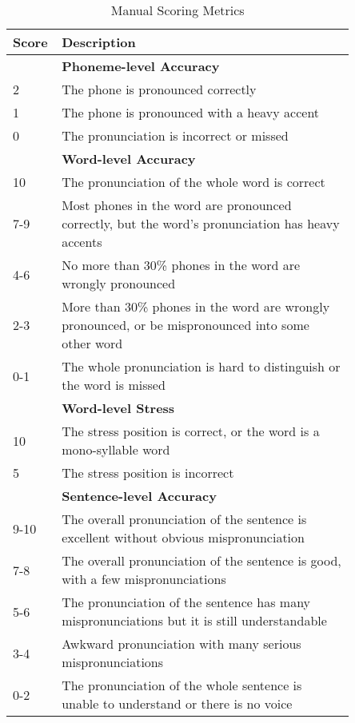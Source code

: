 \documentclass[a4paper]{article}
\begin{document}
\begin{table*}[t]
  \caption{Manual Scoring Metrics}
  \label{tab:metrics}
  \centering
  \begin{tabular}{p{0.05\linewidth}p{0.8\linewidth}}
    \toprule
    \textbf{Score}   & \textbf{Description} \\
    \hline
    ~                & \textbf{Phoneme-level Accuracy} \\
    2                & The phone is pronounced correctly \\
    1                & The phone is pronounced with a heavy accent \\
    0                & The pronunciation is incorrect or missed \\
    \hline
    ~                & \textbf{Word-level Accuracy} \\
    10               & The pronunciation of the whole word is correct \\
    7-9              & Most phones in the word are pronounced correctly, but the word's pronunciation has heavy accents \\
    4-6              & No more than 30\% phones in the word are wrongly pronounced \\
    2-3              & More than 30\% phones in the word are wrongly pronounced, or be mispronounced into some other word \\
    0-1              & The whole pronunciation is hard to distinguish or the word is missed \\
    \hline
    ~                & \textbf{Word-level Stress} \\
    10               & The stress position is correct, or the word is a mono-syllable word \\
    5                & The stress position is incorrect \\
    \hline
    ~                & \textbf{Sentence-level Accuracy} \\
    9-10             & The overall pronunciation of the sentence is excellent without obvious mispronunciation \\
    7-8              & The overall pronunciation of the sentence is good, with a few mispronunciations \\
    5-6              & The pronunciation of the sentence has many mispronunciations but it is still understandable \\
    3-4              & Awkward pronunciation with many serious mispronunciations \\
    0-2              & The pronunciation of the whole sentence is unable to understand or there is no voice \\

\end{tabular}
\end{table*}
\end{document}
